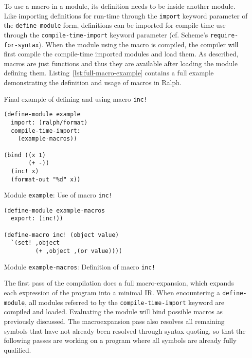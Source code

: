 \documentclass{acm_proc_article-sp}
\makeatletter
\newenvironment{sublisting}[2][]{%
\def\sf@one{#1}%
\def\sf@two{#2}%
\setbox\sf@box\hbox
\bgroup
}{%
\egroup
\ifx\@empty\sf@two\@empty\relax
\def\sf@two{\@empty}
\fi
\ifx\@empty\sf@one\@empty\relax
\subfloat[\sf@two]{\box\sf@box}%
\else
\subfloat[\sf@one][\sf@two]{\box\sf@box}%
\fi
}
\makeatother
\begin{document}
To use a macro in a module, its definition needs to be inside another
module. Like importing definitions for run-time through the
\texttt{import} keyword parameter of the \texttt{define-module} form,
definitions can be imported for compile-time use through the
\texttt{compile-time-import} keyword parameter (cf. Scheme's
\texttt{require-for-syntax}). When the module using the macro is
compiled, the compiler will first compile the compile-time imported
modules and load them. As described, macros are just functions and
thus they are available after loading the module defining them.
Listing~\ref{lst:full-macro-example} contains a full example
demonstrating the definition and usage of macros in Ralph.

\begin{mylisting}[h]
  \caption{Final example of defining and using macro \texttt{inc!}}
  \label{lst:full-macro-example}
  \vspace{-2em}
  \begin{sublisting}{Module \texttt{example}: Use of macro \texttt{inc!}}
    \begin{minipage}[b]{.7\textwidth}
      \begin{lstlisting}
(define-module example
  import: (ralph/format)
  compile-time-import:
    (example-macros))

(bind ((x 1)
       (+ -))
  (inc! x)
  (format-out "%d" x))
      \end{lstlisting}
    \end{minipage}
  \end{sublisting}
  \hfill
  \begin{sublisting}{Module \texttt{example-macros}: Definition of macro \texttt{inc!}}
    \begin{minipage}[b]{.7\textwidth}
      \begin{lstlisting}
(define-module example-macros
  export: (inc!))

(define-macro inc! (object value)
  `(set! ,object
         (+ ,object ,(or value))))
      \end{lstlisting}
    \end{minipage}
  \end{sublisting}
\end{mylisting}
\vspace{-0.5em}

The first pass of the compilation does a full macro-expansion, which
expands each expression of the program into a minimal IR. When
encountering a \texttt{define-module}, all modules referred to by the
\texttt{compile-time-import} keyword are compiled and
loaded. Evaluating the module will bind possible macros as previously
discussed. The macroexpansion pass also resolves all remaining symbols
that have not already been resolved through syntax quoting, so that
the following passes are working on a program where all symbols
are already fully qualified.
\end{document}
